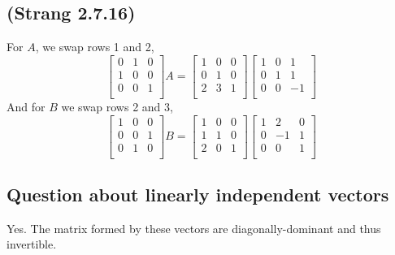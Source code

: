 \documentclass[10pt]{article}
\begin{document}
\subsection{(Strang 2.7.16)}
For $A$, we swap rows 1 and 2,
\[
\begin{bmatrix}
	0& 1& 0\\
	1& 0& 0\\
	0& 0& 1\\
\end{bmatrix}A=
\begin{bmatrix}
	1& 0& 0\\
	0& 1& 0\\
	2& 3& 1\\
\end{bmatrix}
\begin{bmatrix}
	1& 0& 1\\
	0& 1& 1\\
	0& 0& -1\\
\end{bmatrix}
\]
And for $B$ we swap rows 2 and 3,
\[
\begin{bmatrix}
	1& 0& 0\\
	0& 0& 1\\
	0& 1& 0\\
\end{bmatrix}B=
\begin{bmatrix}
	1& 0& 0\\
	1& 1& 0\\
	2& 0& 1\\
\end{bmatrix}
\begin{bmatrix}
	1& 2& 0\\
	0& -1& 1\\
	0& 0& 1\\
\end{bmatrix}
\]

\subsection{Question about linearly independent vectors}
Yes. The matrix formed by these vectors are diagonally-dominant and thus invertible.
\end{document}
